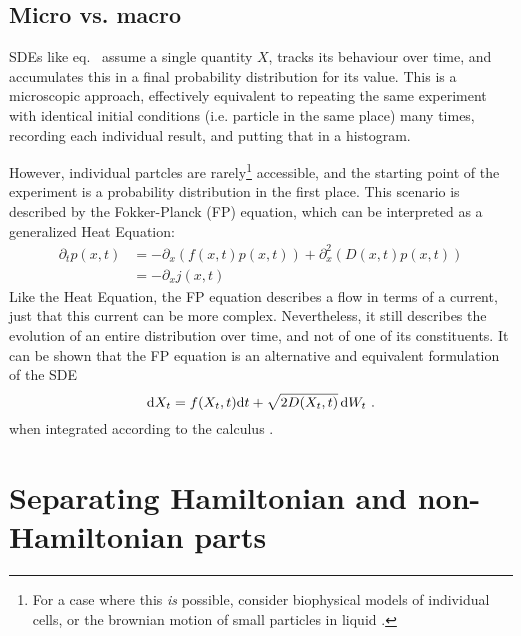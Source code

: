 \subsection{Micro vs. macro}

SDEs like eq.~ assume a single quantity \(X\), tracks its behaviour over time, and accumulates this in a final probability distribution for its value. This is a microscopic approach, effectively equivalent to repeating the same experiment with identical initial conditions (i.e. particle in the same place) many times, recording each individual result, and putting that in a histogram.

However, individual partcles are rarely\footnote{For a case where this \emph{is} possible, consider biophysical models of individual cells, or the brownian motion of small particles in liquid \cite{sengupta}.} accessible, and the starting point of the experiment is a probability distribution in the first place. This scenario is described by the Fokker-Planck (FP) equation, which can be interpreted as a generalized Heat Equation:
%
\begin{equation}
	\label{eqn:fp}
	\begin{split}
	\partial_tp(x,t)
	&= - \partial_x (f(x,t)p(x,t)) + \partial_x^2 (D(x,t)p(x,t)) \\
	&= -\partial_xj(x,t)
	\end{split}
\end{equation}
%
Like the Heat Equation, the FP equation describes a flow in terms of a current, just that this current can be more complex. Nevertheless, it still describes the evolution of an entire distribution over time, and not of one of its constituents. It can be shown that the FP equation is an alternative and equivalent formulation of the SDE
%
\begin{equation}
	\mathrm{d} X_t = f(X_t,t)\mathrm{d} t + \sqrt{2 D(X_t,t)}\,\mathrm{d} W_t ~.
\end{equation}
%
when integrated according to the \Ito{} calculus \cite{sde}.















\section{Separating Hamiltonian and non-Hamiltonian parts}

